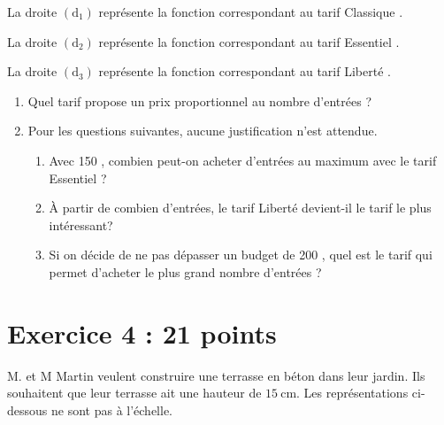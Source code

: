 \documentclass[11pt]{article}
\newcommand{\euro}{\eurologo{}}
\begin{document}
La droite $(\mathrm{d}_{1})$ représente la fonction correspondant au tarif \og{} Classique \fg{}.

La droite $(\mathrm{d}_{2})$ représente la fonction correspondant au tarif \og{} Essentiel \fg{}.

La droite $(\mathrm{d}_{3})$ représente la fonction correspondant au tarif \og{} Liberté \fg{}.

\begin{enumerate}[resume]

	\item Quel tarif propose un prix proportionnel au nombre d'entrées ?

	\item Pour les questions suivantes, aucune justification n'est attendue.

	\begin{enumerate}
		\item Avec 150 \euro{}, combien peut-on acheter d'entrées au maximum avec le tarif \og{} Essentiel \fg{}?
		\item À partir de combien d'entrées, le tarif \og{} Liberté \fg{} devient-il le tarif le plus intéressant?
		\item Si on décide de ne pas dépasser un budget de 200 \euro{}, quel est le tarif qui permet d'acheter le plus grand nombre d'entrées ?
	\end{enumerate}
\end{enumerate}

\section*{Exercice 4 : \hfill 21 points}

M. et M Martin veulent construire une terrasse en béton dans leur jardin. Ils souhaitent que leur terrasse ait une hauteur de $15 \mathrm{~cm}$. Les représentations ci-dessous ne sont pas à l'échelle.
\end{document}
